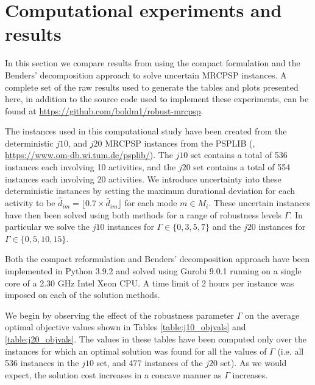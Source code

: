 \documentclass[a4paper,abstracton]{scrartcl}
\begin{document}
\section{Computational experiments and results} \label{section:experiments}
 
In this section we compare results from using the compact formulation and the Benders' decomposition approach to solve uncertain MRCPSP instances. A complete set of the raw results used to generate the tables and plots presented here, in addition to the source code used to implement these experiments, can be found at \url{https://github.com/boldm1/robust-mrcpsp}.

The instances used in this computational study have been created from the deterministic $j10$, and $j20$ MRCPSP instances from the PSPLIB (\cite{kolisch1997psplib}, \url{https://www.om-db.wi.tum.de/psplib/}). The $j10$ set contains a total of 536 instances each involving 10 activities, and the $j20$ set contains a total of 554 instances each involving 20 activities. We introduce uncertainty into these deterministic instances by setting the maximum durational deviation for each activity to be $\hat{d}_{im}=\lfloor0.7\times \bar{d}_{im}\rfloor$ for each mode $m\in M_i$. These uncertain instances have then been solved using both methods for a range of robustness levels $\Gamma$. In particular we solve the $j10$ instances for $\Gamma\in\{0,3,5,7\}$ and the $j20$ instances for $\Gamma\in\{0,5,10,15\}$. 

Both the compact reformulation and Benders' decomposition approach have been implemented in Python 3.9.2 and solved using Gurobi 9.0.1 running on a single core of a 2.30 GHz Intel Xeon CPU. A time limit of 2 hours per instance was imposed on each of the solution methods.

We begin by observing the effect of the robustness parameter $\Gamma$ on the average optimal objective values shown in Tables \ref{table:j10_objvals} and \ref{table:j20_objvals}. The values in these tables have been computed only over the instances for which an optimal solution was found for all the values of $\Gamma$ (i.e. all 536 instances in the $j10$ set, and 477 instances of the $j20$ set). As we would expect, the solution cost increases in a concave manner as $\Gamma$ increases. 
\end{document}
